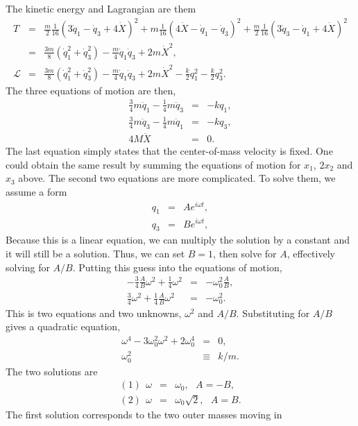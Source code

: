 The kinetic energy and Lagrangian are them
\begin{eqnarray*}
T&=&\frac{m}{2}\frac{1}{16}(3\dot{q}_1-\dot{q}_3+4\dot{X})^2
+m\frac{1}{16}(4\dot{X}-\dot{q}_1-\dot{q}_3)^2
+\frac{m}{2}\frac{1}{16}(3\dot{q}_3-\dot{q}_1+4\dot{X})^2\\ &=&\frac{3m}{8}(\dot{q}_1^2+\dot{q}_3^2)-\frac{m}{4}\dot{q}_1\dot{q}_3
+2m\dot{X}^2,\\ \mathcal{L}&=&\frac{3m}{8}(\dot{q}_1^2+\dot{q}_3^2)-\frac{m}{4}\dot{q}_1\dot{q}_3
+2m\dot{X}^2-\frac{k}{2}q_1^2-\frac{k}{2}q_3^2.
\end{eqnarray*}
The three equations of motion are then,
\begin{eqnarray*}
\frac{3}{4}m\ddot{q}_1-\frac{1}{4}m\ddot{q}_3&=&-kq_1,\\ \frac{3}{4}m\ddot{q}_3-\frac{1}{4}m\ddot{q}_1&=&-kq_3,\\ 4M\ddot{X}&=&0.
\end{eqnarray*}
The last equation simply states that the center-of-mass velocity is
fixed. One could obtain the same result by summing the equations of
motion for $x_1$, $2x_2$ and $x_3$ above. The second two equations are
more complicated. To solve them, we assume a form
\begin{eqnarray*}
q_1&=&Ae^{i\omega t},\\ q_3&=&Be^{i\omega t},
\end{eqnarray*}
Because this is a linear equation, we can multiply the solution by a
constant and it will still be a solution. Thus, we can set $B=1$, then
solve for $A$, effectively solving for $A/B$. Putting this guess into
the equations of motion,
\begin{eqnarray*}
-\frac{3}{4}\frac{A}{B}\omega^2+\frac{1}{4}\omega^2&=&-\omega_0^2\frac{A}{B},\\ \frac{3}{4}\omega^2+\frac{1}{4}\frac{A}{B}\omega^2&=&-\omega_0^2.
\end{eqnarray*}
This is two equations and two unknowns, $\omega^2$ and
$A/B$. Substituting for $A/B$ gives a quadratic equation,
\begin{eqnarray*}
\omega^4-3\omega_0^2\omega^2+2\omega_0^4&=&0,\\ \omega_0^2&\equiv&k/m.
\end{eqnarray*}
The two solutions are
\begin{eqnarray*}
(1)~~\omega&=&\omega_0,~~~A=-B,\\ (2)~~\omega&=&\omega_0\sqrt{2},~~~A=B.
\end{eqnarray*}
The first solution corresponds to the two outer masses moving in
